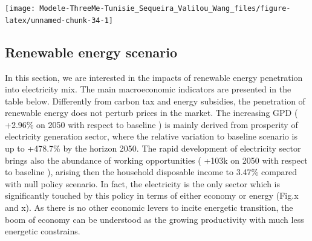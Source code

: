 \documentclass[
]{article}
\begin{document}
\begin{center}\texttt{[image: Modele-ThreeMe-Tunisie\_Sequeira\_Valilou\_Wang\_files/figure-latex/unnamed-chunk-34-1]} \end{center}

\hypertarget{renewable-energy-scenario}{%
\subsection{Renewable energy scenario}\label{renewable-energy-scenario}}

In this section, we are interested in the impacts of renewable energy
penetration into electricity mix. The main macroeconomic indicators are
presented in the table below. Differently from carbon tax and energy
subsidies, the penetration of renewable energy does not perturb prices
in the market. The increasing GPD ( +2.96\% on 2050 with respect to
baseline ) is mainly derived from prosperity of electricity generation
sector, where the relative variation to baseline scenario is up to
+478.7\% by the horizon 2050. The rapid development of electricity
sector brings also the abundance of working opportunities ( +103k on
2050 with respect to baseline ), arising then the household disposable
income to 3.47\% compared with null policy scenario. In fact, the
electricity is the only sector which is significantly touched by this
policy in terms of either economy or energy (Fig.x and x). As there is
no other economic levers to incite energetic transition, the boom of
economy can be understood as the growing productivity with much less
energetic constrains.
\end{document}
